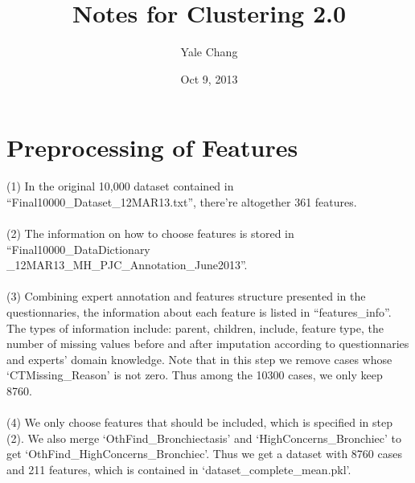 \documentclass[11pt]{article}
\title{\textbf{Notes for Clustering 2.0}}
\author{Yale Chang}
\date{Oct 9, 2013}
\begin{document}
\maketitle

\section{Preprocessing of Features}
(1) In the original 10,000 dataset contained in ``Final10000\_Dataset\_12MAR13.txt'', there're altogether 361 features.\\
\\ 
(2) The information on how to choose features is stored in ``Final10000\_DataDictionary\\\_12MAR13\_MH\_PJC\_Annotation\_June2013''. \\
\\
(3) Combining expert annotation and features structure presented in the questionnaries, the information about each feature is listed in ``features\_info''. The types of information include: parent, children, include, feature type, the number of missing values before and after imputation according to questionnaries and experts' domain knowledge. Note that in this step we remove cases whose `CTMissing\_Reason' is not zero. Thus among the 10300 cases, we only keep 8760. \\
\\
(4) We only choose features that should be included, which is specified in step (2). We also merge `OthFind\_Bronchiectasis' and `HighConcerns\_Bronchiec' to get `OthFind\_HighConcerns\_Bronchiec'. Thus we get a dataset with 8760 cases and 211 features, which is contained in `dataset\_complete\_mean.pkl'. \\
\\
\end{document}
